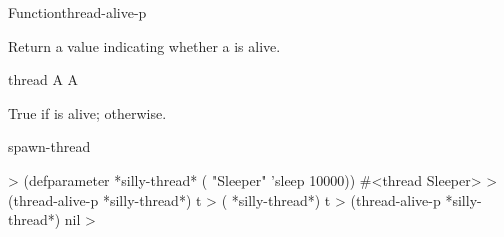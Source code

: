 \begin{functiondoc}{Function}{thread-alive-p}{ 
    \returns{} }

\fnsyntax

\fnpurpose Return a value indicating whether a  is alive.

\fnpackage {}

\fnmodule {}

\fnargs
\begin{args}{thread}
\arg[thread] A 
\arg[boolean] A 
\end{args}

\fnreturns True if  is alive; \nil{} otherwise.

\fnerrors
\nothreads{}

\begin{alsos}{spawn-thread}
\end{alsos}

%
%
\fnexamples
%
\W\supp
\begin{example}
  > (defparameter *silly-thread* ( "Sleeper" 'sleep 10000))
  #<thread Sleeper>
  > (thread-alive-p *silly-thread*)
  t
  > ( *silly-thread*)
  t
  > (thread-alive-p *silly-thread*)
  nil
  >
\end{example}

\end{functiondoc}


